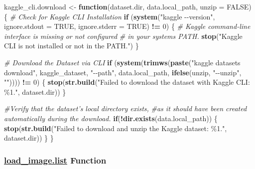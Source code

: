 \documentclass[
]{report}
\newenvironment{Shaded}{\begin{snugshade}}{\end{snugshade}}
\newcommand{\AttributeTok}[1]{\textcolor[rgb]{0.13,0.29,0.53}{#1}}
\newcommand{\CommentTok}[1]{\textcolor[rgb]{0.56,0.35,0.01}{\textit{#1}}}
\newcommand{\ConstantTok}[1]{\textcolor[rgb]{0.56,0.35,0.01}{#1}}
\newcommand{\ControlFlowTok}[1]{\textcolor[rgb]{0.13,0.29,0.53}{\textbf{#1}}}
\newcommand{\DecValTok}[1]{\textcolor[rgb]{0.00,0.00,0.81}{#1}}
\newcommand{\FunctionTok}[1]{\textcolor[rgb]{0.13,0.29,0.53}{\textbf{#1}}}
\newcommand{\NormalTok}[1]{#1}
\newcommand{\OtherTok}[1]{\textcolor[rgb]{0.56,0.35,0.01}{#1}}
\newcommand{\SpecialCharTok}[1]{\textcolor[rgb]{0.81,0.36,0.00}{\textbf{#1}}}
\newcommand{\StringTok}[1]{\textcolor[rgb]{0.31,0.60,0.02}{#1}}
\begin{document}
\begin{Shaded}
\begin{Highlighting}[]
\NormalTok{kaggle\_cli.download }\OtherTok{\textless{}{-}} \ControlFlowTok{function}\NormalTok{(dataset.dir, data.local\_path, }\AttributeTok{unzip =} \ConstantTok{FALSE}\NormalTok{) \{}
  \CommentTok{\# Check for Kaggle CLI Installation}
  \ControlFlowTok{if}\NormalTok{ (}\FunctionTok{system}\NormalTok{(}\StringTok{"kaggle {-}{-}version"}\NormalTok{, }\AttributeTok{ignore.stdout =} \ConstantTok{TRUE}\NormalTok{, }\AttributeTok{ignore.stderr =} \ConstantTok{TRUE}\NormalTok{) }\SpecialCharTok{!=} \DecValTok{0}\NormalTok{) \{}
    \CommentTok{\#\textquotesingle{} Kaggle command{-}line interface is missing or not configured }
    \CommentTok{\#\textquotesingle{} in your system\textquotesingle{}s PATH.}
    \FunctionTok{stop}\NormalTok{(}\StringTok{"Kaggle CLI is not installed or not in the PATH."}\NormalTok{)}
\NormalTok{  \}}
  
  \CommentTok{\# Download the Dataset via CLI}
  \ControlFlowTok{if}\NormalTok{ (}\FunctionTok{system}\NormalTok{(}\FunctionTok{trimws}\NormalTok{(}\FunctionTok{paste}\NormalTok{(}\StringTok{"kaggle datasets download"}\NormalTok{, kaggle\_dataset, }\StringTok{"{-}{-}path"}\NormalTok{, }
\NormalTok{                          data.local\_path, }\FunctionTok{ifelse}\NormalTok{(unzip, }\StringTok{"{-}{-}unzip"}\NormalTok{, }\StringTok{""}\NormalTok{)))) }\SpecialCharTok{!=} \DecValTok{0}\NormalTok{) \{}
    \FunctionTok{stop}\NormalTok{(}\FunctionTok{str.build}\NormalTok{(}\StringTok{"Failed to download the dataset with Kaggle CLI: \textasciigrave{}\%1\textasciigrave{}."}\NormalTok{, dataset.dir))}
\NormalTok{  \}}
  
  \CommentTok{\#\textquotesingle{}Verify that the dataset’s local directory exists, }
  \CommentTok{\#\textquotesingle{}as it should have been created automatically during the download.}
  \ControlFlowTok{if}\NormalTok{(}\SpecialCharTok{!}\FunctionTok{dir.exists}\NormalTok{(data.local\_path)) \{}
    \FunctionTok{stop}\NormalTok{(}\FunctionTok{str.build}\NormalTok{(}\StringTok{"Failed to download and unzip the Kaggle dataset: \textasciigrave{}\%1\textasciigrave{}."}\NormalTok{, dataset.dir))}
\NormalTok{  \}}
\NormalTok{\}}
\end{Highlighting}
\end{Shaded}

\newpage

\subsubsection{\texorpdfstring{\href{https://github.com/AzKurban-edX-DS/edx.capstone.choose-your-own/blob/main/r/support-functions/data-helper.R\#L80}{load\_image.list} Function}{load\_image.list Function}}\label{func.load_image.list}
\end{document}
